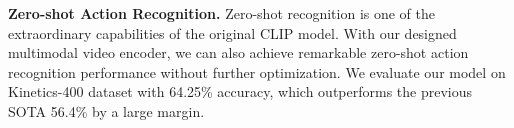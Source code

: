 \textbf{Zero-shot Action Recognition.}
Zero-shot recognition is one of the extraordinary capabilities of the original CLIP model. With our designed multimodal video encoder, we can also achieve remarkable zero-shot action recognition performance without further optimization. We evaluate our model on Kinetics-400 dataset with 64.25\% accuracy, which outperforms the previous SOTA 56.4\% \cite{Wang2021ActionCLIPAN} by a large margin.